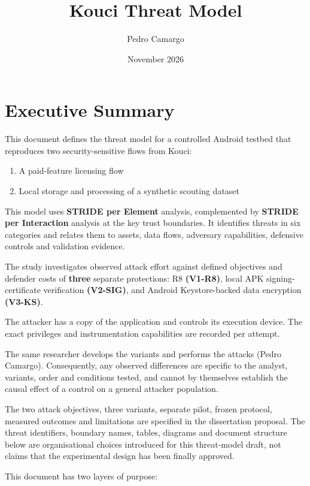\documentclass{article}
\title{Kouci Threat Model}
\author{Pedro Camargo}
\date{November 2026}
\newcounter{threat}
\begin{document}


\setcounter{page}{1}

\tableofcontents
\newpage

\section{Executive Summary}

This document defines the threat model for a controlled Android testbed that reproduces two security-sensitive flows from Kouci:

\begin{enumerate}
    \item A paid-feature licensing flow
    \item Local storage and processing of a synthetic scouting dataset
\end{enumerate}



This model uses \textbf{STRIDE per Element} analysis, complemented by \textbf{STRIDE per Interaction} analysis at the key trust boundaries. It identifies threats in six categories and relates them to assets, data flows, adversary capabilities, defensive controls and validation evidence.

The study investigates observed attack effort against defined objectives and defender costs of \textbf{three} separate protections: R8 \textbf{(V1-R8)}, local APK signing-certificate verification \textbf{(V2-SIG)}, and Android Keystore-backed data encryption \textbf{(V3-KS)}.

The attacker has a copy of the application and controls its execution device. The exact privileges and instrumentation capabilities are recorded per attempt.

The same researcher develops the variants and performs the attacks (Pedro Camargo). Consequently, any observed differences are specific to the analyst, variants, order and conditions tested, and cannot by themselves establish the causal effect of a control on a general attacker population.

The two attack objectives, three variants, separate pilot, frozen protocol, measured outcomes and limitations are specified in the dissertation proposal. The threat identifiers, boundary names, tables, diagrams and document structure below are organisational choices introduced for this threat-model draft, not claims that the experimental design has been finally approved.

This document has two layers of purpose:
\end{document}
